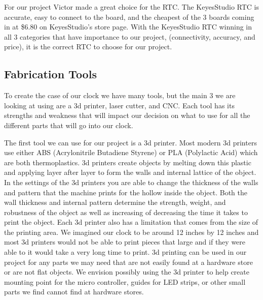 \documentclass[onecolumn, draftclsnofoot,10pt, compsoc]{IEEEtran}
\begin{document}
For our project Victor made a great choice for the RTC.
The KeyesStudio RTC is accurate, easy to connect to the board, and the cheapest of the 3 boards coming in at \$6.80 on KeyesStudio’s store page.
With the KeyesStudio RTC winning in all 3 categories that have importance to our project, (connectivity, accuracy, and price), it is the correct RTC to choose for our project.

\subsection{Fabrication Tools}
To create the case of our clock we have many tools, but the main 3 we are looking at using are a 3d printer, laser cutter, and CNC.
Each tool has its strengths and weakness that will impact our decision on what to use for all the different parts that will go into our clock.

The first tool we can use for our project is a 3d printer.
Most modern 3d printers use either ABS (Acrylonitrile Butadiene Styrene) or PLA (Polylactic Acid) which are both thermoplastics.
3d printers create objects by melting down this plastic and applying layer after layer to form the walls and internal lattice of the object.
In the settings of the 3d printers you are able to change the thickness of the walls and pattern that the machine prints for the hollow inside the object.
Both the wall thickness and internal pattern determine the strength, weight, and robustness of the object as well as increasing of decreasing the time it takes to print the object. Each 3d printer also has a limitation that comes from the size of the printing area.
We imagined our clock to be around 12 inches by 12 inches and most 3d printers would not be able to print pieces that large and if they were able to it would take a very long time to print.
3d printing can be used in our project for any parts we may need that are not easily found at a hardware store or are not flat objects.
We envision possibly using the 3d printer to help create mounting point for the micro controller, guides for LED strips, or other small parts we find cannot find at hardware stores.
\end{document}
